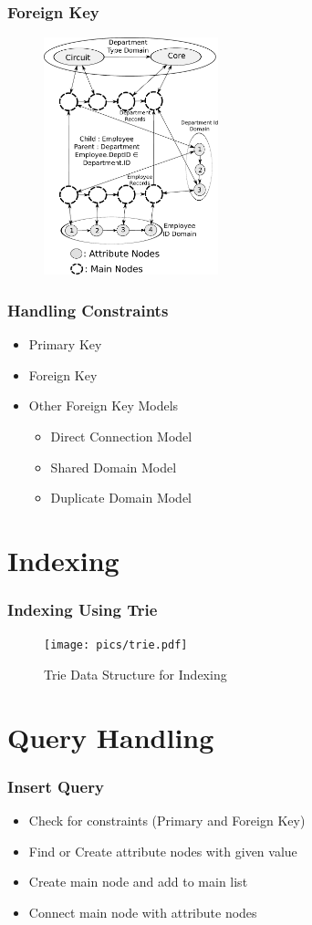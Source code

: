 \documentclass[14pt,xcolor=dvipsnames]{beamer}
\begin{document}
\begin{frame}
 \frametitle{Foreign Key}
 \begin{figure}[h]
 \centering
 \includegraphics[width=0.45\textwidth]{pics/foreign_key.pdf}
\end{figure}
\end{frame}

\begin{frame}
 \frametitle{Handling Constraints}
 \begin{itemize}
  \item Primary Key
  \item Foreign Key
  \item Other Foreign Key Models
  \begin{itemize}
    \item<2-> Direct Connection Model
    \item<3-> Shared Domain Model
    \item<4-> Duplicate Domain Model
  \end{itemize}
 \end{itemize}
\end{frame}
 
\section{Indexing}
\begin{frame}
 \frametitle{Indexing Using Trie}
 \begin{figure}
 \centering
 \texttt{[image: pics/trie.pdf]}
 \caption{Trie Data Structure for Indexing}
 \end{figure}
\end{frame}

\section{Query Handling}
\begin{frame}
\frametitle{Insert Query}
\begin{itemize}
 \item<1-> Check for constraints (Primary and Foreign Key)
 \item<2-> Find or Create attribute nodes with given value
 \item<3-> Create main node and add to main list
 \item<4-> Connect main node with attribute nodes
\end{itemize}
\end{frame}
\end{document}
